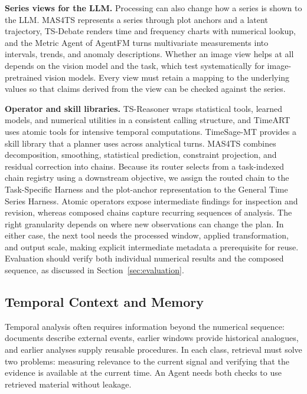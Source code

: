 \documentclass[preprints,article,submit,moreauthors]{Definitions/mdpi}
\begin{document}
\noindent\textbf{Series views for the LLM.} Processing can also change how a series is shown to the LLM. MAS4TS \citep{mas4ts2026} represents a series through plot anchors and a latent trajectory, TS-Debate \citep{multimodaldebate2026} renders time and frequency charts with numerical lookup, and the Metric Agent of AgentFM \citep{agentfm2025} turns multivariate measurements into intervals, trends, and anomaly descriptions. Whether an image view helps at all depends on the vision model and the task, which \citet{shen2026imagessignals} test systematically for image-pretrained vision models. Every view must retain a mapping to the underlying values so that claims derived from the view can be checked against the series.

\noindent\textbf{Operator and skill libraries.} TS-Reasoner \citep{tsreasoner2026} wraps statistical tools, learned models, and numerical utilities in a consistent calling structure, and TimeART \citep{timeart2026} uses atomic tools for intensive temporal computations. TimeSage-MT \citep{timesagemt2026} provides a skill library that a planner uses across analytical turns. MAS4TS combines decomposition, smoothing, statistical prediction, constraint projection, and residual correction into chains. Because its router selects from a task-indexed chain registry using a downstream objective, we assign the routed chain to the Task-Specific Harness and the plot-anchor representation to the General Time Series Harness. Atomic operators expose intermediate findings for inspection and revision, whereas composed chains capture recurring sequences of analysis. The right granularity depends on where new observations can change the plan. In either case, the next tool needs the processed window, applied transformation, and output scale, making explicit intermediate metadata a prerequisite for reuse. Evaluation should verify both individual numerical results and the composed sequence, as discussed in Section~\ref{sec:evaluation}.

\subsection{Temporal Context and Memory}
\label{sec:temporal-context}

Temporal analysis often requires information beyond the numerical sequence: documents describe external events, earlier windows provide historical analogues, and earlier analyses supply reusable procedures. In each class, retrieval must solve two problems: measuring relevance to the current signal and verifying that the evidence is available at the current time. An Agent needs both checks to use retrieved material without leakage.
\end{document}
